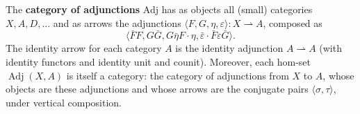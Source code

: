 The \textbf{category of adjunctions} Adj has as objects all (small) categories $X, A, D, \ldots$ and as arrows the adjunctions $\langle F, G, \eta, \varepsilon \rangle : X \rightharpoonup A$, composed as
$$\langle \bar{F}F, G\bar{G}, G\bar{\eta}F \cdot \eta, \bar{\varepsilon} \cdot \bar{F}\varepsilon\bar{G} \rangle.$$
The identity arrow for each category $A$ is the identity adjunction $A \rightharpoonup A$ (with identity functors and identity unit and counit). Moreover, each hom-set $\operatorname{Adj}(X, A)$ is itself a category: the category of adjunctions from $X$ to $A$, whose objects are these adjunctions and whose arrows are the conjugate pairs $\langle \sigma, \tau \rangle$, under vertical composition.
